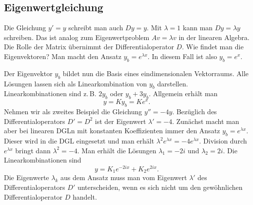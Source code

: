 \documentclass[a4paper,10pt,fleqn,twocolumn,twoside,openany]{article}
\numberwithin{equation}{section}
\theoremstyle{definition}
\begin{document}
\subsection{Eigenwertgleichung}

Die Gleichung $y'=y$ schreibt man auch $Dy=y$. Mit $\lambda=1$
kann man $Dy=\lambda y$ schreiben. Das ist analog zum Eigenwertproblem
$Av=\lambda v$ in der linearen Algebra. Die Rolle der Matrix übernimmt
der Differentialoperator $D$. Wie findet man die Eigenvektoren?
Man macht den Ansatz $y_b=e^{\lambda x}$. In diesem Fall ist
also $y_b=e^x$.

Der Eigenvektor $y_b$ bildet nun die Basis eines eindimensionalen
Vektorraums. Alle Lösungen lassen sich als Linearkombination von $y_b$
darstellen. Linearkombinationen sind z.\,B. $2y_b$ oder $y_b+3y_b$.
Allgemein erhält man%
\begin{equation}
y = Ky_b = Ke^x.
\end{equation}
Nehmen wir als zweites Beispiel die Gleichung $y''=-4y$. Bezüglich
des Differentialoperators $D'=D^2$ ist der Eigenwert $\lambda'=-4$.
Zunächst macht man aber bei linearen DGLn mit konstanten Koeffizienten
immer den Ansatz $y_b=e^{\lambda x}$. Dieser  wird in die DGL
eingesetzt und man erhält $\lambda^2 e^{\lambda x} = -4e^{\lambda x}$.
Division durch $e^{\lambda x}$ bringt dann $\lambda^2 = -4$.
Man erhält die Lösungen $\lambda_1 = -2i$ und $\lambda_2 = 2i$.
Die Linearkombinationen sind
\begin{equation}
y=K_1e^{-2ix}+K_2e^{2ix}.
\end{equation}
Die Eigenwerte $\lambda_k$ aus dem Ansatz muss man vom
Eigenwert $\lambda'$ des Differentialoperators $D'$ unterscheiden,
wenn es sich nicht um den gewöhnlichen Differentialoperator $D$
handelt.
\end{document}
